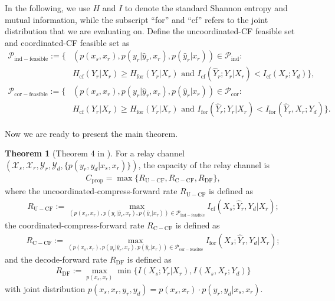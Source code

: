 \documentclass[12pt]{article}
\theoremstyle{definition}
\newtheorem{theorem}{Theorem}
\begin{document}
In the following, we use $H$ and $I$ to denote the standard Shannon entropy and mutual information, while the subscript ``for'' and ``cf'' refers to the joint distribution that we are evaluating on. Define the uncoordinated-CF feasible set and coordinated-CF feasible set as
\begin{align*}
    \mathcal P_{\mathrm{ind-feasible}}:=\{& (p(x_s, x_r) , p(y_r | \hat{y}_r, x_r), p(\hat{y}_r|x_r)) \in \mathcal P_{\mathrm{ind}} : \\
    & H_{\mathrm{cf}}(Y_r | X_r) \geq H_{\mathrm{for}}(Y_r|X_r) \text{ and } I_{\mathrm{cf}}(\hat{Y}_r ; Y_r | X_r) < I_{\mathrm{cf}}(X_r; Y_d)\}, \\
    \mathcal P_{\mathrm{cor-feasible}}:=\{& (p(x_s, x_r) , p(y_r | \hat{y}_r, x_r), p(\hat{y}_r|x_r)) \in \mathcal P_{\mathrm{cor}} : \\
    & H_{\mathrm{cf}}(Y_r | X_r) \geq H_{\mathrm{for}}(Y_r|X_r) \text{ and } I_{\mathrm{for}}(\hat{Y}_r ; Y_r | X_r) < I_{\mathrm{for}}(\hat{Y}_r, X_r; Y_d)\}.
\end{align*}

Now we are ready to present the main theorem. 
\begin{theorem}[Theorem 4 in \cite{pon26}] \label{thm: main thm}
    For a relay channel $(\mathcal X_s,\mathcal X_r, \mathcal Y_r, \mathcal Y_d, \{p(y_r, y_d | x_s, x_r)\})$, the capacity of the relay channel is 
    \begin{align*}
        C_{\mathrm{prop}} = \max\{R_{\mathrm{U-CF}}, R_{\mathrm{C-CF}}, R_{\mathrm{DF}}\},
    \end{align*}
    where the uncoordinated-compress-forward rate $R_{\mathrm{U-CF}}$ is defined as
    \begin{align*}
        R_{\mathrm{U-CF}} := \max_{(p(x_s, x_r), p(y_r |\hat{y}_r, x_r), p(\hat{y}_r|x_r)) \in \mathcal P_{\mathrm{ind-feasible}}} I_{\mathrm{cf}}(X_s; \hat{Y}_r, Y_d | X_r);
    \end{align*}
    the coordinated-compress-forward rate $R_{\mathrm{C-CF}}$ is defined as 
    \begin{align*}
        R_{\mathrm{C-CF}} := \max_{(p(x_s, x_r), p(y_r |\hat{y}_r, x_r), p(\hat{y}_r|x_r)) \in \mathcal P_{\mathrm{cor-feasible}}} I_{\mathrm{for}}(X_s; \hat{Y}_r, Y_d | X_r);
    \end{align*}
    and the decode-forward rate $R_{\mathrm{DF}}$ is defined as 
    \begin{align*}
        R_{\mathrm{DF}} := \max_{p(x_s, x_r)} \min\{I(X_s; Y_r | X_r), I(X_s, X_r; Y_d)\}
    \end{align*}
    with joint distribution $p(x_s, x_r, y_r, y_d) = p(x_s, x_r) \cdot p(y_r, y_d | x_s, x_r)$.
\end{theorem}
\end{document}
